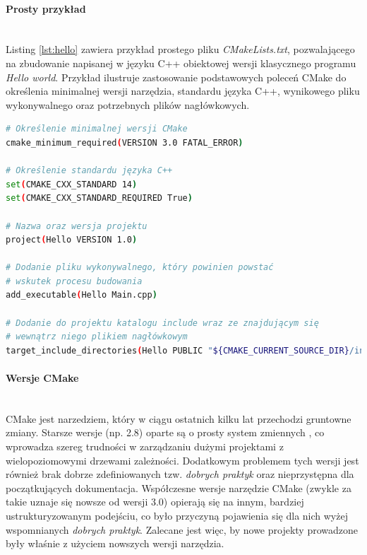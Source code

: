 \paragraph*{Prosty przykład}\mbox{} \\
Listing \ref{lst:hello} zawiera przykład prostego pliku \textit{CMakeLists.txt}, pozwalającego na zbudowanie napisanej w języku C++ obiektowej wersji klasycznego programu \textit{Hello world}. Przykład ilustruje zastosowanie podstawowych poleceń CMake do określenia minimalnej wersji narzędzia, standardu języka C++, wynikowego pliku wykonywalnego oraz potrzebnych plików nagłówkowych. \par

\begin{lstlisting}[language=bash,caption={Przykład prostego pliku CMakeLists.txt przeznaczonego do budowania programu napisanego w C++}, label={lst:hello}]
# Określenie minimalnej wersji CMake
cmake_minimum_required(VERSION 3.0 FATAL_ERROR)

# Określenie standardu języka C++
set(CMAKE_CXX_STANDARD 14)
set(CMAKE_CXX_STANDARD_REQUIRED True)

# Nazwa oraz wersja projektu
project(Hello VERSION 1.0)

# Dodanie pliku wykonywalnego, który powinien powstać
# wskutek procesu budowania
add_executable(Hello Main.cpp)

# Dodanie do projektu katalogu include wraz ze znajdującym się 
# wewnątrz niego plikiem nagłówkowym
target_include_directories(Hello PUBLIC "${CMAKE_CURRENT_SOURCE_DIR}/include")
\end{lstlisting}

\paragraph*{Wersje CMake}\mbox{} \\
CMake jest narzedziem, który w ciągu ostatnich kilku lat przechodzi gruntowne zmiany. Starsze wersje (np. 2.8) oparte są o prosty system zmiennych \cite{CMakeRight}, co wprowadza szereg trudności w zarządzaniu dużymi projektami z wielopoziomowymi drzewami zależności. Dodatkowym problemem tych wersji jest również brak dobrze zdefiniowanych tzw. \textit{dobrych praktyk} oraz nieprzystępna dla początkujących dokumentacja. Współczesne wersje narzędzie CMake (zwykle za takie uznaje się nowsze od wersji 3.0) opierają się na innym, bardziej ustrukturyzowanym \cite{CMakeRight} podejściu, co było przyczyną pojawienia się dla nich wyżej wspomnianych \textit{dobrych praktyk}. Zalecane jest więc, by nowe projekty prowadzone były właśnie z użyciem nowszych wersji narzędzia.

